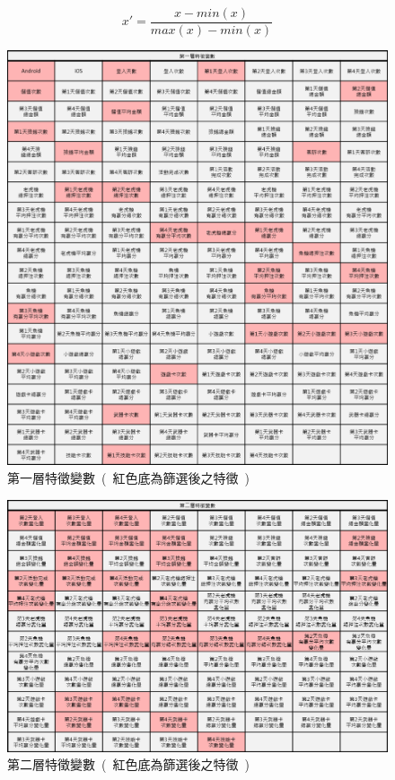 \begin{equation}
  \label{eq:Normalization}
  x' = \frac{x-min(x)}{max(x)-min(x)}
\end{equation}
\newpage

\begin{figure}[!htb]
    \begin{center}
      \includegraphics[width=1\textwidth]{figures/evaluation/Image_FirstFeatures.png}
      \caption[第一層特徵變數]{第一層特徵變數\ (\ 紅色底為篩選後之特徵\ )}
      \label{fig:eva_FirstFeatures}
    \end{center}
\end{figure}

\begin{figure}[!htb]
    \begin{center}
      \includegraphics[width=1\textwidth]{figures/evaluation/Image_SecondFeatures.png}
      \caption[第二層特徵變數]{第二層特徵變數\ (\ 紅色底為篩選後之特徵\ )}
      \label{fig:eva_SecondFeatures}
    \end{center}
\end{figure}
\newpage

